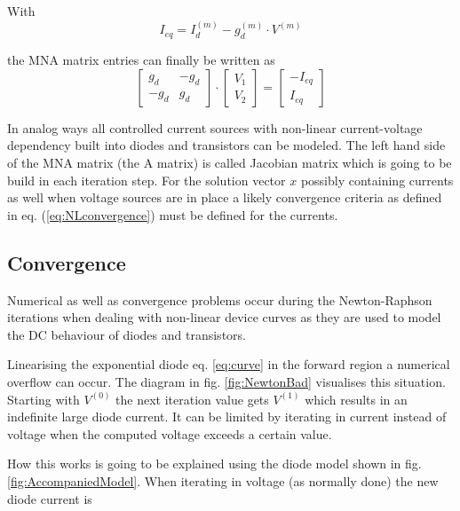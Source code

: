\documentclass[10pt]{report}
\begin{document}
\label{sec:DCdiode}

With
\begin{equation}
I_{eq} = I_{d}^{(m)} - g_{d}^{(m)}\cdot V^{(m)}
\end{equation}

the MNA matrix entries can finally be written as
\begin{equation}
\begin{bmatrix}
g_{d} & -g_{d}\\
-g_{d} & g_{d}
\end{bmatrix}
\cdot
\begin{bmatrix}
V_{1}\\
V_{2}
\end{bmatrix}
=
\begin{bmatrix}
-I_{eq}\\
I_{eq}
\end{bmatrix}
\end{equation}

In analog ways all controlled current sources with non-linear
current-voltage dependency built into diodes and transistors can be
modeled.  The left hand side of the MNA matrix (the A matrix) is
called Jacobian matrix which is going to be build in each iteration
step.  For the solution vector $x$ possibly containing currents as
well when voltage sources are in place a likely convergence criteria
as defined in eq. (\ref{eq:NLconvergence}) must be defined for the
currents.

\subsection{Convergence}

Numerical as well as convergence problems occur during the
Newton-Raphson iterations when dealing with non-linear device curves
as they are used to model the DC behaviour of diodes and transistors.

\addvspace{12pt}

Linearising the exponential diode eq. \eqref{eq:curve} in the forward
region a numerical overflow can occur.  The diagram in
fig. \ref{fig:NewtonBad} visualises this situation.  Starting with
$V^{(0)}$ the next iteration value gets $V^{(1)}$ which results in an
indefinite large diode current.  It can be limited by iterating in
current instead of voltage when the computed voltage exceeds a certain
value.

\addvspace{12pt}

How this works is going to be explained using the diode model shown in
fig. \ref{fig:AccompaniedModel}.  When iterating in voltage (as
normally done) the new diode current is
\end{document}
